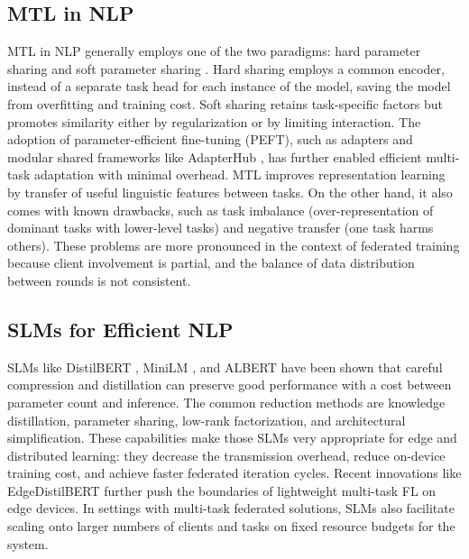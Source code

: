 \subsection{MTL in NLP}
MTL in NLP generally employs one of the two paradigms: hard parameter sharing and soft parameter sharing \cite{smith2017mocha,yu2020pcgrad}. Hard sharing employs a common encoder, instead of a separate task head for each instance of the model, saving the model from overfitting and training cost. Soft sharing retains task-specific factors but promotes similarity either by regularization or by limiting interaction. The adoption of parameter-efficient fine-tuning (PEFT), such as adapters \cite{houlsby2019parameter} and modular shared frameworks like AdapterHub \cite{pfeiffer2020adapterhub}, has further enabled efficient multi-task adaptation with minimal overhead. MTL improves representation learning by transfer of useful linguistic features between tasks. On the other hand, it also comes with known drawbacks, such as task imbalance (over-representation of dominant tasks with lower-level tasks) and negative transfer (one task harms others). These problems are more pronounced in the context of federated training because client involvement is partial, and the balance of data distribution between rounds is not consistent.

\subsection{SLMs for Efficient NLP}
SLMs like DistilBERT \cite{sanh2019distilbert}, MiniLM \cite{wang2020minilm}, and ALBERT \cite{lan2019albert} have been shown that careful compression and distillation can preserve good performance with a cost between parameter count and inference. The common reduction methods are knowledge distillation, parameter sharing, low-rank factorization, and architectural simplification. These capabilities make those SLMs very appropriate for edge and distributed learning: they decrease the transmission overhead, reduce on-device training cost, and achieve faster federated iteration cycles. Recent innovations like EdgeDistilBERT \cite{wang2025edgedistilbert} further push the boundaries of lightweight multi-task FL on edge devices. In settings with multi-task federated solutions, SLMs also facilitate scaling onto larger numbers of clients and tasks on fixed resource budgets for the system.

